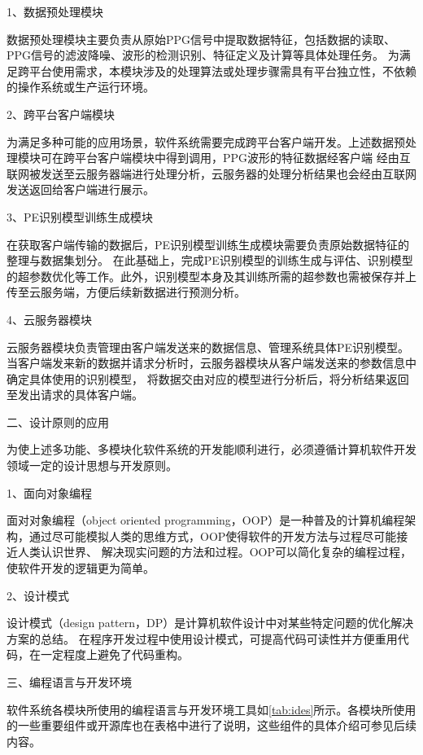 1、数据预处理模块

数据预处理模块主要负责从原始PPG信号中提取数据特征，包括数据的读取、PPG信号的滤波降噪、波形的检测识别、特征定义及计算等具体处理任务。
为满足跨平台使用需求，本模块涉及的处理算法或处理步骤需具有平台独立性，不依赖的操作系统或生产运行环境。

2、跨平台客户端模块

为满足多种可能的应用场景，软件系统需要完成跨平台客户端开发。上述数据预处理模块可在跨平台客户端模块中得到调用，PPG波形的特征数据经客户端
经由互联网被发送至云服务器端进行处理分析，云服务器的处理分析结果也会经由互联网发送返回给客户端进行展示。

3、PE识别模型训练生成模块

在获取客户端传输的数据后，PE识别模型训练生成模块需要负责原始数据特征的整理与数据集划分。
在此基础上，完成PE识别模型的训练生成与评估、识别模型的超参数优化等工作。此外，识别模型本身及其训练所需的超参数也需被保存并上传至云服务端，方便后续新数据进行预测分析。

4、云服务器模块

云服务器模块负责管理由客户端发送来的数据信息、管理系统具体PE识别模型。当客户端发来新的数据并请求分析时，云服务器模块从客户端发送来的参数信息中确定具体使用的识别模型，
将数据交由对应的模型进行分析后，将分析结果返回至发出请求的具体客户端。

二、设计原则的应用

为使上述多功能、多模块化软件系统的开发能顺利进行，必须遵循计算机软件开发领域一定的设计思想与开发原则。

1、面向对象编程

面对对象编程（object oriented programming，OOP）是一种普及的计算机编程架构，通过尽可能模拟人类的思维方式，OOP使得软件的开发方法与过程尽可能接近人类认识世界、
解决现实问题的方法和过程。OOP可以简化复杂的编程过程，使软件开发的逻辑更为简单。

2、设计模式

设计模式（design pattern，DP）是计算机软件设计中对某些特定问题的优化解决方案的总结\cite{Gamma1993,Enrich2018}。
在程序开发过程中使用设计模式，可提高代码可读性并方便重用代码，在一定程度上避免了代码重构。

三、编程语言与开发环境

软件系统各模块所使用的编程语言与开发环境工具如\autoref{tab:ides}所示。各模块所使用的一些重要组件或开源库也在表格中进行了说明，这些组件的具体介绍可参见后续内容。

